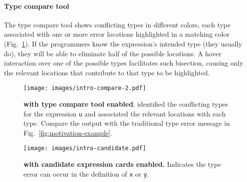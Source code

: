 

\paragraph{Type compare tool} \label{sub:type-compare}

The type compare tool shows conflicting types in different colors, each type associated with one or more error locations highlighted in a matching color (Fig.~\ref{fig:compare}).  
If the programmers know the expression's intended type (they usually do), they will be able to eliminate half of the possible locations. 
A hover interaction over one of the possible types facilitates such bisection, causing only the relevant locations that contribute to that type to be highlighted. 


\begin{figure}[ht]
    \centering
    \texttt{[image: images/intro-compare-2.pdf]}
    \caption[\chameleon{} with type compare tool enabled]{
        \textbf{\chameleon{} with type compare tool enabled}. \chameleon{} identified the conflicting types for the expression \texttt{u} and associated the relevant locations with each type. Compare the output with the traditional type error message in Fig.~\ref{fig:motivation-example}.
}
    \label{fig:compare}
\end{figure}

\begin{figure}[ht]
    \centering
    \texttt{[image: images/intro-candidate.pdf]}
    \caption[\chameleon{} with candidate expression cards enabled.]{
        \textbf{\chameleon{} with candidate expression cards enabled.}
        Indicates the type error can occur in the definition of \texttt{x} or \texttt{y}.
    }
    \label{fig:expression}
\end{figure}


